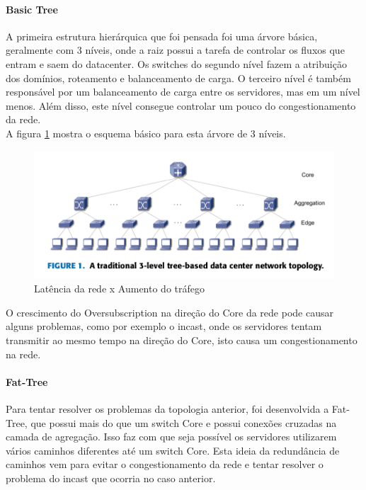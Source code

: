\documentclass[12pt,a4paper]{report}
\begin{document}
\paragraph{Basic Tree}
A primeira estrutura hierárquica que foi pensada foi uma árvore básica, geralmente com 3 níveis, onde a raiz possui a tarefa de controlar os fluxos que entram e saem do datacenter. Os switches do segundo nível fazem a atribuição dos domínios, roteamento e balanceamento de carga. O terceiro nível é também responsável por um balanceamento de carga entre os servidores, mas em um nível menos. Além disso, este nível consegue controlar um pouco do congestionamento da rede.\\

A figura \ref{basic_tree} mostra o esquema básico para esta árvore de 3 níveis.\\

\begin{figure}[H]
\centering
\includegraphics[width=.8\textwidth]{imagens/basic_tree.png}
\caption{Latência da rede x Aumento do tráfego}
\label{basic_tree}
\end{figure}

O crescimento do Oversubscription na direção do Core da rede pode causar alguns problemas, como por exemplo o incast, onde os servidores tentam transmitir ao mesmo tempo na direção do Core, isto causa um congestionamento na rede.\\

\paragraph{Fat-Tree}
Para tentar resolver os problemas da topologia anterior, foi desenvolvida a Fat-Tree, que possui mais do que um switch Core e possui conexões cruzadas na camada de agregação. Isso faz com que seja possível os servidores utilizarem vários caminhos diferentes até um switch Core. Esta ideia da redundância de caminhos vem para evitar o congestionamento da rede e tentar resolver o problema do incast que ocorria no caso anterior.\\
\end{document}
